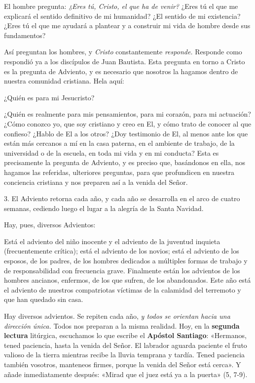 El hombre pregunta: \emph{¿Eres tú, Cristo, el que ha de venir?} ¿Eres
tú el que me explicará el sentido definitivo de mi humanidad? ¿El
sentido de mi existencia? ¿Eres tú el que me ayudará a plantear y a
construir mi vida de hombre desde sus fundamentos?

Así preguntan los hombres, y \emph{Cristo} constantemente
\emph{responde.} Responde como respondió ya a los discípulos de Juan
Bautista. Esta pregunta en torno a Cristo es la pregunta de Adviento, y
es necesario que nosotros la hagamos dentro de nuestra comunidad
cristiana. Hela aquí:

¿Quién es para mi Jesucristo?

¿Quién es realmente para mis pensamientos, para mi corazón, para mi
actuación? ¿Cómo conozco yo, que soy cristiano y creo en El, y cómo
trato de conocer al que confieso? ¿Hablo de El a los otros? ¿Doy
testimonio de El, al menos ante los que están más cercanos a mí en la
casa paterna, en el ambiente de trabajo, de la universidad o de la
escuela, en toda mi vida y en mi conducta? Esta es precisamente la
pregunta de Adviento, y es preciso que, basándonos en ella, nos hagamos
las referidas, ulteriores preguntas, para que profundicen en nuestra
conciencia cristiana y nos preparen así a la venida del Señor.

3. El Adviento retorna cada año, y cada año se desarrolla en el arco de
cuatro semanas, cediendo luego el lugar a la alegría de la Santa
Navidad.

Hay, pues, diversos Advientos:

Está el adviento del niño inocente y el adviento de la juventud inquieta
(frecuentemente crítica); está el adviento de los novios; está el
adviento de los esposos, de los padres, de los hombres dedicados a
múltiples formas de trabajo y de responsabilidad con frecuencia grave.
Finalmente están los advientos de los hombres ancianos, enfermos, de los
que sufren, de los abandonados. Este año está el adviento de nuestros
compatriotas víctimas de la calamidad del terremoto y que han quedado
sin casa.

Hay diversos advientos. Se repiten cada año, \emph{y todos se orientan
	hacia una dirección única.} Todos nos preparan a la misma realidad. Hoy,
en la \textbf{segunda lectura} litúrgica, escuchamos lo que escribe el
\textbf{Apóstol Santiago}: «Hermanos, tened paciencia, hasta la venida
del Señor. El labrador aguarda paciente el fruto valioso de la tierra
mientras recibe la lluvia temprana y tardía. Tened paciencia también
vosotros, manteneos firmes, porque la venida del Señor está cerca». Y
añade inmediatamente después: «Mirad que el juez está ya a la puerta»
(5, 7-9).

